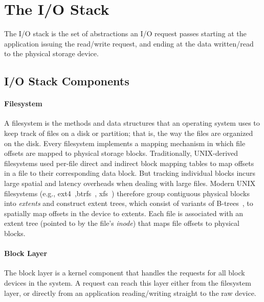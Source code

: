 \section{The I/O Stack}
The I/O stack is the set of abstractions an I/O request passes starting at the application
issuing the read/write request, and ending at the data written/read to the physical storage
device.

\subsection*{I/O Stack Components}
\paragraph{Filesystem}
A filesystem is the methods and data structures that an operating system uses to keep track of
files on a disk or partition; that is, the way the files are organized on the disk.
Every filesystem implements a mapping mechanism in which file offsets are mapped to physical
 storage blocks.
Traditionally, UNIX-derived filesystems used per-file direct and indirect  block mapping tables
to map offsets in a file to their corresponding data block. But tracking individual blocks
incurs large spatial and latency overheads when dealing with large files. 
Modern UNIX filesystems (e.g., ext4~\cite{mathur07ext4},btrfs~\cite{rodeh13btrfs},
 xfs~\cite{sweeney96xfs}) therefore group contiguous physical blocks
 into \emph{extents} and construct extent trees, which consist of variants of
 B-trees~\cite{comer79btree}, to spatially map offsets in the device to extents.
Each file is associated with an extent tree (pointed to by the file's \emph{inode}) that maps
 file offsets to physical blocks.

\paragraph{Block Layer}
The block layer is a kernel component that handles the requests for all block devices in the system.
A request can reach this layer either from the filesystem layer, or directly from an application reading/writing straight to the raw device.


